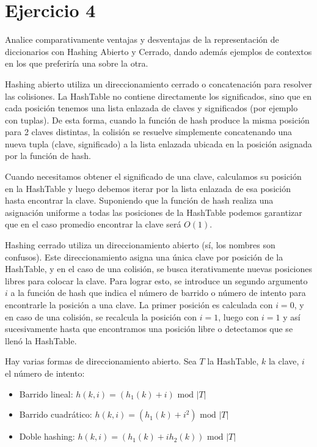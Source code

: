 \section*{Ejercicio 4}

Analice comparativamente ventajas y desventajas de la representación de diccionarios con Hashing Abierto y Cerrado, dando además ejemplos de contextos en los que preferiría una sobre la otra.

Hashing abierto utiliza un direccionamiento cerrado o concatenación para resolver las colisiones. La HashTable no contiene directamente los significados, sino que en cada posición tenemos una lista enlazada de claves y significados (por ejemplo con tuplas). De esta forma, cuando la función de hash produce la misma posición para 2 claves distintas, la colisión se resuelve simplemente concatenando una nueva tupla (clave, significado) a la lista enlazada ubicada en la posición asignada por la función de hash.

Cuando necesitamos obtener el significado de una clave, calculamos su posición en la HashTable y luego debemos iterar por la lista enlazada de esa posición hasta encontrar la clave. Suponiendo que la función de hash realiza una asignación uniforme a todas las posiciones de la HashTable podemos garantizar que en el caso promedio encontrar la clave será $O(1)$.

Hashing cerrado utiliza un direccionamiento abierto (sí, los nombres son confusos). Este direccionamiento asigna una única clave por posición de la HashTable, y en el caso de una colisión, se busca iterativamente nuevas posiciones libres para colocar la clave. Para lograr esto, se introduce un segundo argumento $i$ a la función de hash que indica el número de barrido o número de intento para encontrarle la posición a una clave. La primer posición es calculada con $i=0$, y en caso de una colisión, se recalcula la posición con $i=1$, luego con $i=1$ y así sucesivamente hasta que encontramos una posición libre o detectamos que se llenó la HashTable.

Hay varias formas de direccionamiento abierto. Sea $T$ la HashTable, $k$ la clave, $i$ el número de intento:

\begin{itemize}
    \item Barrido lineal: $h(k, i) = (h_1(k) + i) \text{ mod } |T|$
    \item Barrido cuadrático: $h(k, i) = (h_1(k) + i^2) \text{ mod } |T|$
    \item Doble hashing: $h(k, i) = (h_1(k) + i h_2(k)) \text{ mod } |T|$
\end{itemize}

